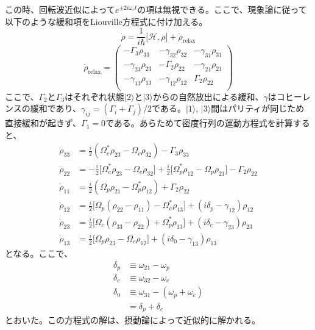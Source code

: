 \documentclass[dvipdfmx]{jsarticle}
\begin{document}
この時、回転波近似によって$e^{\pm 2i\omega_c t}$の項は無視できる。ここで、現象論に従って以下のような緩和項をLiouville方程式に付け加える。
\begin{equation}
    \dot{\rho} = \frac{1}{i\hbar} \lbrack \mathcal{H}, \rho \rbrack + \dot{\rho}_{\text{relax}}
\end{equation}
\begin{equation}
    \dot{\rho}_{\text{relax}} = 
    \begin{pmatrix} 
        -\Gamma_3 \rho_{33} & -\gamma_{32}\rho_{32}  & -\gamma_{31}\rho_{31}  \\
        -\gamma_{23}\rho_{23} & -\Gamma_2 \rho_{22}  &  -\gamma_{21} \rho_{21}  \\
        -\gamma_{13}\rho_{13} & -\gamma_{12} \rho_{12} & \Gamma_2 \rho_{22} \\
    \end{pmatrix}
\end{equation}
ここで、$\Gamma_2$と$\Gamma_3$はそれぞれ状態$| 2 \rangle$と$| 3 \rangle$からの自然放出による緩和、$\gamma$はコヒーレンスの緩和であり、$\gamma_{ij} = (\Gamma_i + \Gamma_j) / 2$である。$| 1 \rangle$, $| 3 \rangle$間はパリティが同じため直接緩和が起きず、$\Gamma_1 = 0$である。あらためて密度行列の運動方程式を計算すると、
\begin{align}
\label{dot-rho-33}
{\dot{\rho}_{33}} &= \frac{i}{2} \left( \Omega_c^* {\rho_{23}} - \Omega_c{\rho_{32}} \right) - \Gamma_3 \rho_{33} \\
{\dot{\rho}_{22}} &= -\frac{i}{2} \lbrack \Omega_c^* {\rho_{23}} - \Omega_c{\rho_{32}} \rbrack + \frac{i}{2} \lbrack \Omega_p^* {\rho_{12}} - \Omega_p{\rho_{21}} \rbrack - \Gamma_2 \rho_{22} \\
{\dot{\rho}_{11}} &= \frac{i}{2} \left( \Omega_p {\rho_{21}} - \Omega_p^*{\rho_{12}} \right) + \Gamma_2 \rho_{22} \\
{\dot{\rho}_{12}} &= \frac{i}{2} \lbrack \Omega_p (\rho_{22} - \rho_{11}) - \Omega_c^* \rho_{13} \rbrack + \left( i\delta_p -\gamma_{12} \right) \rho_{12} \\
{\dot{\rho}_{23}} &= \frac{i}{2} \lbrack \Omega_c (\rho_{33} - \rho_{22}) + \Omega_p^* \rho_{13} \rbrack + \left( i\delta_c -\gamma_{23} \right) \rho_{23} \\
\label{dot-rho-11}
{\dot{\rho}_{13}} &= \frac{i}{2} \lbrack \Omega_p \rho_{23} - \Omega_c \rho_{12} \rbrack + \left( i\delta_0 -\gamma_{13} \right) \rho_{13}
\end{align}
となる。ここで、
\begin{equation}
\begin{split}
    \delta_p &\equiv \omega_{21} - \omega_p \\
    \delta_c &\equiv \omega_{32} - \omega_c \\
    \delta_0 &\equiv \omega_{31} - (\omega_p + \omega_c) \\
    &= \delta_p + \delta_c
\end{split}
\end{equation}
とおいた。この方程式の解は、摂動論によって近似的に解かれる。
\end{document}
